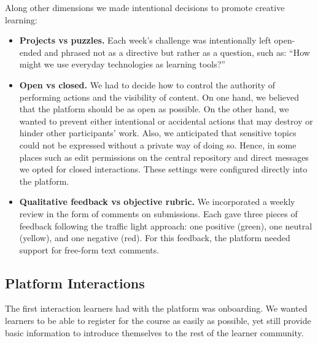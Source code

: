 \documentclass[12pt,twoside]{mitthesis}
\begin{document}
{Along other dimensions we made intentional decisions to promote creative learning:
\begin{itemize}
\item \textbf{Projects vs puzzles.} Each week's challenge was intentionally left open-ended and phrased not as a directive but rather as a question, such as: ``How might we use everyday technologies as learning tools?''
\item \textbf{Open vs closed.} We had to decide how to control the authority of performing actions and the visibility of content. On one hand, we believed that the platform should be as open as possible. On the other hand, we wanted to prevent either intentional or accidental actions that may destroy or hinder other participants' work. Also, we anticipated that sensitive topics could not be expressed without a private way of doing so. Hence, in some places such as edit permissions on the central repository and direct messages we opted for closed interactions. These settings were configured directly into the platform.
\item \textbf{Qualitative feedback vs objective rubric.} We incorporated a weekly review in the form of comments on submissions. Each gave three pieces of feedback following the traffic light approach: one positive (green), one neutral (yellow), and one negative (red). For this feedback, the platform needed support for free-form text comments.
\end{itemize}
}

\subsection{Platform Interactions}

The first interaction learners had with the platform was onboarding. We wanted learners to be able to register for the course as easily as possible, yet still provide basic information to introduce themselves to the rest of the learner community.
\end{document}
